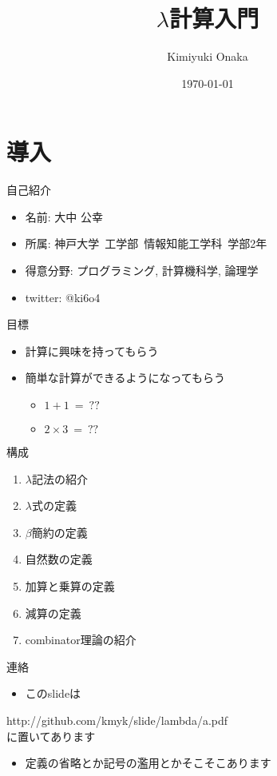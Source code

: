 \documentclass[pdflatex,17pt]{beamer}
\title{$\lambda$計算入門}
\author{Kimiyuki Onaka}
\date{\today}
\begin{document}
\maketitle

\section{導入}
\begin{frame}{自己紹介}
    \begin{itemize}
        \item 名前: 大中 公幸
        \item 所属: 神戸大学~工学部~情報知能工学科~学部2年
        \item 得意分野: プログラミング, 計算機科学, 論理学
        \item twitter: @ki6o4
    \end{itemize}
\end{frame}

\begin{frame}{目標}
    \begin{itemize}
        \item 計算に興味を持ってもらう
        \item 簡単な計算ができるようになってもらう
        \begin{itemize}
            \item $1 + 1~=~??$
            \item $2 \times 3~=~??$
        \end{itemize}
    \end{itemize}
\end{frame}

\begin{frame}{構成}
    \begin{enumerate}
        \item $\lambda$記法の紹介
        \item $\lambda$式の定義
        \item $\beta$簡約の定義
        \item 自然数の定義
        \item 加算と乗算の定義
        \item 減算の定義
        \item combinator理論の紹介
    \end{enumerate}
\end{frame}

\begin{frame}{連絡}
    \begin{itemize}
        \item このslideは
    \end{itemize}
     {\rm http://github.com/kmyk/slide/lambda/a.pdf} \\ に置いてあります
    \begin{itemize}
        \item 定義の省略とか記号の濫用とかそこそこあります
    \end{itemize}
\end{frame}
\end{document}

